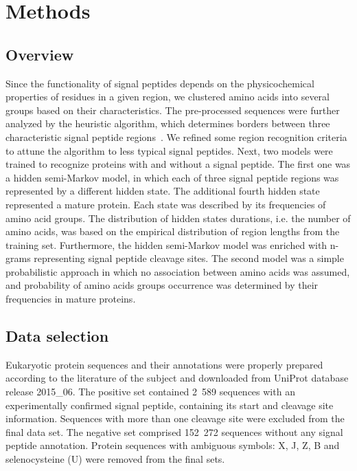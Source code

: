 \documentclass[fleqn,10pt,twoside]{gcb15submission}
\begin{document}
\section*{Methods}

\subsection*{Overview}

Since the functionality of signal peptides depends on the physicochemical properties of residues in a given region, we clustered amino acids into several groups based on their characteristics. The pre-processed sequences were further analyzed by the heuristic algorithm, which determines borders between three characteristic signal peptide regions~\cite{1998nielsenprediction}. We refined some region recognition criteria to attune the algorithm to less typical signal peptides. Next, two models were trained to recognize proteins with and without a signal peptide. The first one was a hidden semi-Markov model, in which each of three signal peptide regions was represented by a different hidden state. The additional fourth hidden state represented a mature protein. Each state was described by its frequencies of amino acid groups. The distribution of hidden states durations, i.e. the number of amino acids, was based on the empirical distribution of region lengths from the training set. Furthermore, the hidden semi-Markov model was enriched with n-grams representing signal peptide cleavage sites. The second model was a simple probabilistic approach in which no association between amino acids was assumed, and probability of amino acids groups occurrence was determined by their frequencies in mature proteins.

\subsection*{Data selection}

Eukaryotic protein sequences and their annotations were properly prepared according to the literature of the subject and downloaded from UniProt database release 2015\_06. The positive set contained 2~589 sequences with an experimentally confirmed signal peptide, containing its start and cleavage site information. Sequences with more than one cleavage site were excluded from the final data set. The negative set comprised 152~272 sequences without any signal peptide annotation. Protein sequences with ambiguous symbols: X, J, Z, B and selenocysteine (U) were removed from the final sets.
\end{document}
